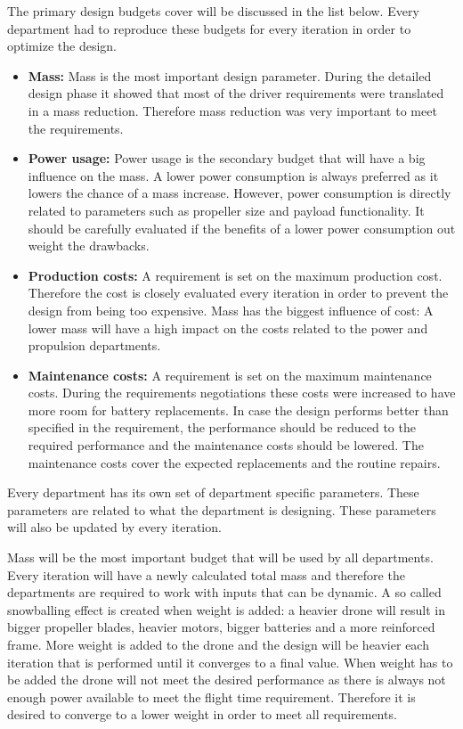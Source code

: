 The primary design budgets cover will be discussed in the list below. Every department had to reproduce these budgets for every iteration in order to optimize the design.
\begin{itemize}[noitemsep,nolistsep]
    \item \textbf{Mass:} Mass is the most important design parameter. During the detailed design phase it showed that most of the driver requirements were translated in a mass reduction. Therefore mass reduction was very important to meet the requirements.
    \item \textbf{Power usage:} Power usage is the secondary budget that will have a big influence on the mass. A lower power consumption is always preferred as it lowers the chance of a mass increase. However, power consumption is directly related to parameters such as propeller size and payload functionality. It should be carefully evaluated if the benefits of a lower power consumption out weight the drawbacks.
    \item \textbf{Production costs:} A requirement is set on the maximum production cost. Therefore the cost is closely evaluated every iteration in order to prevent the design from being too expensive. Mass has the biggest influence of cost: A lower mass will have a high impact on the costs related to the power and propulsion departments.
    \item \textbf{Maintenance costs:} A requirement is set on the maximum maintenance costs. During the requirements negotiations these costs were increased to have more room for battery replacements. In case the design performs better than specified in the requirement, the performance should be reduced to the required performance and the maintenance costs should be lowered. The maintenance costs cover the expected replacements and the routine repairs.
\end{itemize}

Every department has its own set of department specific parameters. These parameters are related to what the department is designing. These parameters will also be updated by every iteration.

Mass will be the most important budget that will be used by all departments. Every iteration will have a newly calculated total mass and therefore the departments are required to work with inputs that can be dynamic. A so called snowballing effect is created when weight is added: a heavier drone will result in bigger propeller blades, heavier motors, bigger batteries and a more reinforced frame. More weight is added to the drone and the design will be heavier each iteration that is performed until it converges to a final value. When weight has to be added the drone will not meet the desired performance as there is always not enough power available to meet the flight time requirement. Therefore it is desired to converge to a lower weight in order to meet all requirements.

